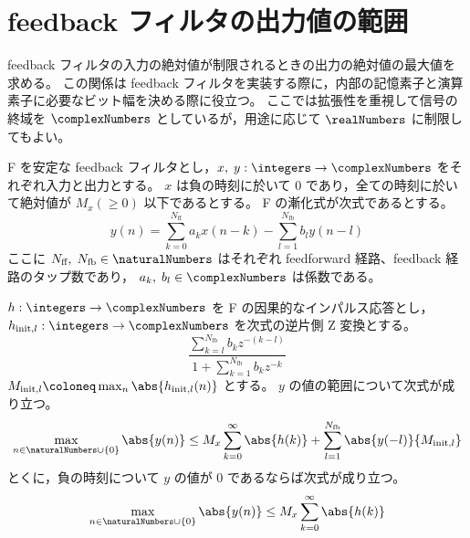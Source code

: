 \section{feedback フィルタの出力値の範囲}
    \newcommand{\Nff}{{N_{\text{ff}}}}
    \newcommand{\Nfb}{{N_{\text{fb}}}}
    \newcommand{\hInit}[1]{{h_{\text{init},#1}}}
    \newcommand{\HInit}[1]{{H_{\text{init},#1}}}
    \newcommand{\Minit}[1]{{M_{\text{init},#1}}}
    feedback フィルタの入力の絶対値が制限されるときの出力の絶対値の最大値を求める。
    この関係は feedback フィルタを実装する際に，内部の記憶素子と演算素子に必要なビット幅を決める際に役立つ。
    ここでは拡張性を重視して信号の終域を $\complexNumbers$ としているが，用途に応じて $\realNumbers$ に制限してもよい。
    \begin{shadebox}
        F を安定な feedback フィルタとし，$x,\;y:\integers\to\complexNumbers$ をそれぞれ入力と出力とする。
        $x$ は負の時刻に於いて 0 であり，全ての時刻に於いて絶対値が $M_x(\geq 0)$ 以下であるとする。
        F の漸化式が次式であるとする。
        \[ y(n) = \sum_{k=0}^\Nff a_k x(n-k) - \sum_{l=1}^\Nfb b_l y(n-l) \]
        ここに $\Nff,\;\Nfb\in\naturalNumbers$ はそれぞれ feedforward 経路、feedback 経路のタップ数であり， $a_k,\;b_l\in\complexNumbers$ は係数である。
        \par
        $h:\integers\to\complexNumbers$ を F の因果的なインパルス応答とし，$\hInit{l}:\integers\to\complexNumbers$ を次式の逆片側 Z 変換とする。
        \[ \frac{\sum_{k=l}^\Nfb b_{k} z^{-(k-l)}}{1+\sum_{k=1}^\Nfb b_k z^{-k}} \]
        $\Minit{l}\coloneq\max_n {\abs{\hInit{l}(n)}}$ とする。
        $y$ の値の範囲について次式が成り立つ。
        \[ \max_{n\in\naturalNumbers\cup\{0\}}\abs{y(n)} \leq M_x\sum_{k=0}^\infty\abs{h(k)} + \sum_{l=1}^\Nfb\abs{y(-l)}\Minit{l} \]
        とくに，負の時刻について $y$ の値が 0 であるならば次式が成り立つ。
        \[ \max_{n\in\naturalNumbers\cup\{0\}}\abs{y(n)} \leq M_x\sum_{k=0}^\infty\abs{h(k)} \]
    \end{shadebox}
